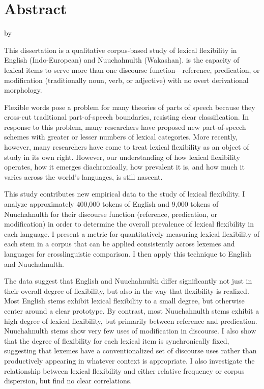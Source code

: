 \clearpage
{}
\section*{Abstract}
\label{sec:abstract}

\begin{center}

  \doctitle

  by

  \theauthor

\end{center}

This dissertation is a qualitative corpus-based study of lexical flexibility in English (Indo-European) and Nuuchahnulth (Wakashan).  is the capacity of lexical items to serve more than one discourse function—reference, predication, or modification (traditionally noun, verb, or adjective) with no overt derivational morphology.

Flexible words pose a problem for many theories of parts of speech because they cross-cut traditional part-of-speech boundaries, resisting clear classification. In response to this problem, many researchers have proposed new part-of-speech schemes with greater or lesser numbers of lexical categories. More recently, however, many researchers have come to treat lexical flexibility as an object of study in its own right. However, our understanding of how lexical flexibility operates, how it emerges diachronically, how prevalent it is, and how much it varies across the world's languages, is still nascent.

This study contributes new empirical data to the study of lexical flexibility. I analyze approximately 400,000 tokens of English and 9,000 tokens of Nuuchahnulth for their discourse function (reference, predication, or modification) in order to determine the overall prevalence of lexical flexibility in each language. I present a metric for quantitatively measuring lexical flexibility of each stem in a corpus that can be applied consistently across lexemes and languages for crosslinguistic comparison. I then apply this technique to English and Nuuchahnulth.

The data suggest that English and Nuuchahnulth differ significantly not just in their overall degree of flexibility, but also in the way that flexibility is realized. Most English stems exhibit lexical flexibility to a small degree, but otherwise center around a clear prototype. By contrast, most Nuuchahnulth stems exhibit a high degree of lexical flexibility, but primarily between reference and predication. Nuuchahnulth stems show very few uses of modification in discourse. I also show that the degree of flexibility for each lexical item is synchronically fixed, suggesting that lexemes have a conventionalized set of discourse uses rather than productively appearing in whatever context is appropriate. I also investigate the relationship between lexical flexibility and either relative frequency or corpus dispersion, but find no clear correlations.

